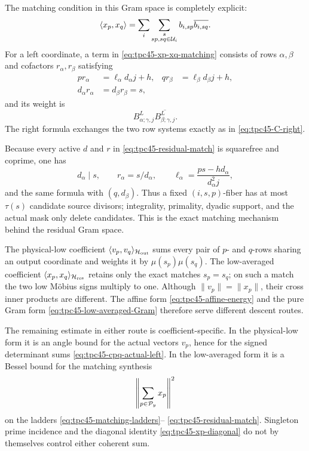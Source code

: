 The matching condition in this Gram space is completely explicit:
\begin{equation}
 \langle x_p,x_q\rangle
 =\sum_i\sum_{\substack{s\\sp,sq\in\mathcal U_i}}
 b_{i,sp}\overline{b_{i,sq}}.
 \label{eq:tpc45-xp-xq-matching}
\end{equation}
For a left coordinate, a term in
\eqref{eq:tpc45-xp-xq-matching} consists of rows \(\alpha,\beta\) and
cofactors \(r_\alpha,r_\beta\) satisfying
\begin{align}
 p r_\alpha&=\ell_\alpha d_\alpha j+h,
 &q r_\beta&=\ell_\beta d_\beta j+h,
 \label{eq:tpc45-matching-ladders}\\
 d_\alpha r_\alpha&=d_\beta r_\beta=s,
 \label{eq:tpc45-residual-match}
\end{align}
and its weight is
\begin{equation}
 B^L_{\alpha;\gamma,j}
 \overline{B^L_{\beta;\gamma,j}}.
 \label{eq:tpc45-matching-weight-left}
\end{equation}
The right formula exchanges the two row systems exactly as in
\eqref{eq:tpc45-C-right}.

Because every active \(d\) and \(r\) in
\eqref{eq:tpc45-residual-match} is squarefree and coprime, one has
\begin{equation}
 d_\alpha\mid s,
 \qquad r_\alpha=s/d_\alpha,
 \qquad
 \ell_\alpha=\frac{ps-hd_\alpha}{d_\alpha^2j},
 \label{eq:tpc45-matching-row-recovery}
\end{equation}
and the same formula with \((q,d_\beta)\).  Thus a fixed
\((i,s,p)\)-fiber has at most \(\tau(s)\) candidate source divisors;
integrality, primality, dyadic support, and the actual mask only delete
candidates.  This is the exact matching mechanism behind the residual
Gram space.

\begin{remark}
\label{rem:tpc45-two-Grams-distinct}
The physical-low coefficient
\(\langle v_p,v_q\rangle_{\mathcal H_{\rm out}}\) sums every pair of
\(p\)- and \(q\)-rows sharing an output coordinate and weights it by
\(\mu(s_p)\mu(s_q)\).  The low-averaged coefficient
\(\langle x_p,x_q\rangle_{\mathcal H_{\rm res}}\) retains only the exact matches
\(s_p=s_q\); on such a match the two low M\"obius signs multiply to one.
Although \(\|v_p\|=\|x_p\|\), their cross inner products are different.
The affine form \eqref{eq:tpc45-affine-energy} and the pure Gram form
\eqref{eq:tpc45-low-averaged-Gram} therefore serve different descent
routes.
\end{remark}

The remaining estimate in either route is coefficient-specific.  In
the physical-low form it is an angle bound for the actual vectors
\(v_p\), hence for the signed determinant sums
\eqref{eq:tpc45-cpq-actual-left}.  In the low-averaged form it is a
Bessel bound for the matching synthesis
\begin{equation}
 \left\|\sum_{p\in\mathcal P_y}x_p\right\|^2
 \label{eq:tpc45-residual-synthesis-gate}
\end{equation}
on the ladders \eqref{eq:tpc45-matching-ladders}--
\eqref{eq:tpc45-residual-match}.  Singleton prime incidence and the
diagonal identity \eqref{eq:tpc45-xp-diagonal} do not by themselves
control either coherent sum.
